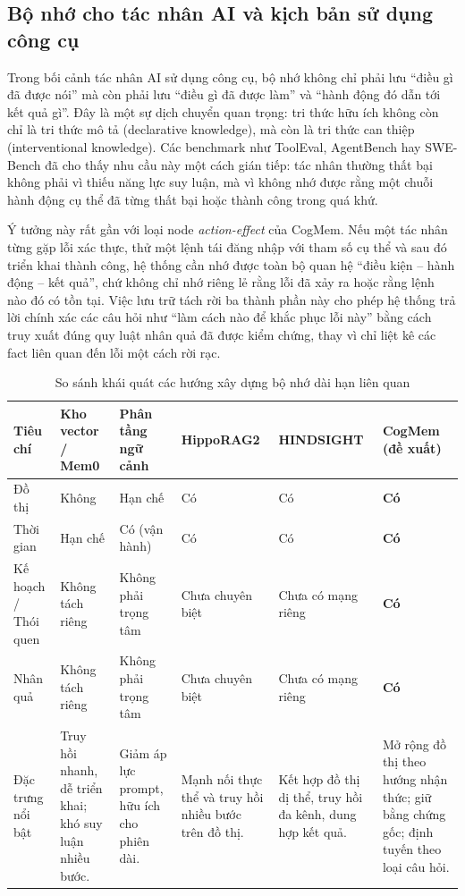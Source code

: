\documentclass[../main.tex]{subfiles}
\begin{document}
\subsection{Bộ nhớ cho tác nhân AI và kịch bản sử dụng công cụ}

Trong bối cảnh tác nhân AI sử dụng công cụ, bộ nhớ không chỉ phải lưu ``điều gì đã được nói'' mà còn phải lưu ``điều gì đã được làm'' và ``hành động đó dẫn tới kết quả gì''. Đây là một sự dịch chuyển quan trọng: tri thức hữu ích không còn chỉ là tri thức mô tả (declarative knowledge), mà còn là tri thức can thiệp (interventional knowledge). Các benchmark như ToolEval, AgentBench hay SWE-Bench đã cho thấy nhu cầu này một cách gián tiếp: tác nhân thường thất bại không phải vì thiếu năng lực suy luận, mà vì không nhớ được rằng một chuỗi hành động cụ thể đã từng thất bại hoặc thành công trong quá khứ.

Ý tưởng này rất gần với loại node \textit{action-effect} của CogMem. Nếu một tác nhân từng gặp lỗi xác thực, thử một lệnh tái đăng nhập với tham số cụ thể và sau đó triển khai thành công, hệ thống cần nhớ được toàn bộ quan hệ ``điều kiện -- hành động -- kết quả'', chứ không chỉ nhớ riêng lẻ rằng lỗi đã xảy ra hoặc rằng lệnh nào đó có tồn tại. Việc lưu trữ tách rời ba thành phần này cho phép hệ thống trả lời chính xác các câu hỏi như ``làm cách nào để khắc phục lỗi này'' bằng cách truy xuất đúng quy luật nhân quả đã được kiểm chứng, thay vì chỉ liệt kê các fact liên quan đến lỗi một cách rời rạc.

\begin{table}[H]
\centering
\caption{So sánh khái quát các hướng xây dựng bộ nhớ dài hạn liên quan}
\label{tab:memory_systems_compare}
\footnotesize
\begin{tabularx}{\linewidth}{@{}p{2.2cm}XXXXX@{}}
\toprule
\textbf{Tiêu chí} & \textbf{Kho vector / Mem0} & \textbf{Phân tầng ngữ cảnh} & \textbf{HippoRAG2} & \textbf{HINDSIGHT} & \textbf{CogMem (đề xuất)} \\
\midrule
Đồ thị & Không & Hạn chế & Có & Có & \textbf{Có} \\
Thời gian & Hạn chế & Có (vận hành) & Có & Có & \textbf{Có} \\
Kế hoạch / Thói quen & Không tách riêng & Không phải trọng tâm & Chưa chuyên biệt & Chưa có mạng riêng & \textbf{Có} \\
Nhân quả & Không tách riêng & Không phải trọng tâm & Chưa chuyên biệt & Chưa có mạng riêng & \textbf{Có} \\
Đặc trưng nổi bật & Truy hồi nhanh, dễ triển khai; khó suy luận nhiều bước. & Giảm áp lực prompt, hữu ích cho phiên dài. & Mạnh nối thực thể và truy hồi nhiều bước trên đồ thị. & Kết hợp đồ thị dị thể, truy hồi đa kênh, dung hợp kết quả. & Mở rộng đồ thị theo hướng nhận thức; giữ bằng chứng gốc; định tuyến theo loại câu hỏi. \\
\bottomrule
\end{tabularx}
\end{table}
\end{document}
